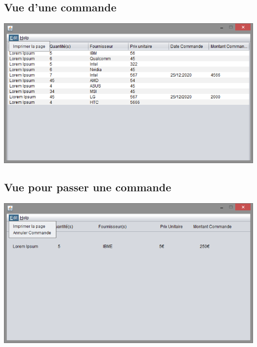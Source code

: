 \subsection{Vue d'une commande}
\begin{center}
	\includegraphics[width=14cm]{CommanderView.png}
\end{center}

\subsection{Vue pour passer une commande}
\begin{center}
	\includegraphics[width=14cm]{CommandeView.png}
\end{center}

